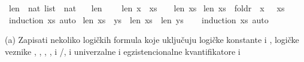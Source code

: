 \begin{isabellebody}
\begin{exercise}[subtitle=Primer jednostavne teorije]
\begin{isamarkuptext}
\end{isamarkuptext}\isamarkuptrue%
\isamarkupfalse%
\ len\ {\isacharcolon}{\kern0pt}{\isacharcolon}{\kern0pt}\ {\isachardoublequoteopen}nat\ list\ {\isasymRightarrow}\ nat{\isachardoublequoteclose}\ \isanewline
\ \ {\isachardoublequoteopen}len\ {\isacharbrackleft}{\kern0pt}{\isacharbrackright}{\kern0pt}\ {\isacharequal}{\kern0pt}\ {}{\isachardoublequoteclose}\isanewline
{\isacharbar}{\kern0pt}\ {\isachardoublequoteopen}len\ {\isacharparenleft}{\kern0pt}x\ {\isacharhash}{\kern0pt}\ xs{\isacharparenright}{\kern0pt}\ {\isacharequal}{\kern0pt}\ {}\ {\isacharplus}{\kern0pt}\ len\ xs{\isachardoublequoteclose}\isanewline
\isanewline
{}\isamarkupfalse%
\ {\isachardoublequoteopen}len\ xs\ {\isacharequal}{\kern0pt}\ foldr\ {\isacharparenleft}{\kern0pt}{\isasymlambda}\ x{\isachardot}{\kern0pt}\ {\isacharparenleft}{\kern0pt}{\isacharplus}{\kern0pt}{\isacharparenright}{\kern0pt}\ {}{\isacharparenright}{\kern0pt}\ xs\ {}{\isachardoublequoteclose}\isanewline
%
\isadelimproof
\ \ %
\endisadelimproof
%
\isatagproof
{}\isamarkupfalse%
\ {\isacharparenleft}{\kern0pt}induction\ xs{\isacharparenright}{\kern0pt}\ auto%
\endisatagproof
{\isafoldproof}%
%
\isadelimproof
\isanewline
%
\endisadelimproof
\isanewline
{}\isamarkupfalse%
\ {\isachardoublequoteopen}len\ {\isacharparenleft}{\kern0pt}xs\ {\isacharat}{\kern0pt}\ ys{\isacharparenright}{\kern0pt}\ {\isacharequal}{\kern0pt}\ len\ xs\ {\isacharplus}{\kern0pt}\ len\ ys{\isachardoublequoteclose}\isanewline
%
\isadelimproof
\ \ %
\endisadelimproof
%
\isatagproof
{}\isamarkupfalse%
\ {\isacharparenleft}{\kern0pt}induction\ xs{\isacharparenright}{\kern0pt}\ auto%
\endisatagproof
{\isafoldproof}%
%
\isadelimproof
%
\endisadelimproof
%
\end{exercise}
%
\begin{exercise}[subtitle=Zapisivanje logičkih formula]
%
\begin{isamarkuptext}%
(a) Zapisati nekoliko logičkih formula koje uključuju 
          logičke konstante  i ,
          logičke veznike \isa{{\isasymnot}}, \isa{{\isasymand}}, \isa{{\isasymor}}, 
          \isa{{\isasymlongrightarrow}}, i \isa{{\isasymlongleftrightarrow}}/\isa{{\isacharequal}{\kern0pt}}, i
          univerzalne i egzistencionalne kvantifikatore \isa{{\isasymforall}} i \isa{{\isasymexists}}%
\end{isamarkuptext}\isamarkuptrue%
\isamarkupfalse%

\end{exercise}
\end{isabellebody}
